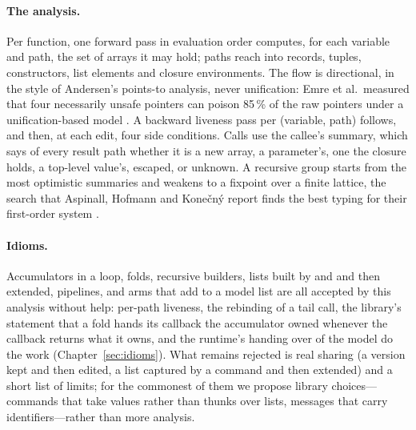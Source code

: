 \paragraph{The analysis.} Per function, one forward pass in evaluation order computes, for each
variable and path, the set of arrays it may hold; paths reach into records, tuples, constructors,
list elements and closure environments. The flow is directional, in the style of Andersen's
points-to analysis, never unification: Emre et al.\ measured that four necessarily unsafe pointers can
poison 85\,\% of the raw pointers under a unification-based model \citep[\S5]{emre2023aliasing}. A
backward liveness pass per (variable, path) follows, and then, at each edit, four side conditions.
Calls use the callee's summary, which says of every result path whether it is a new array, a
parameter's, one the closure holds, a top-level value's, escaped, or unknown. A recursive group starts
from the most optimistic summaries and weakens to a fixpoint over a finite lattice, the search that
Aspinall, Hofmann and Kone\v{c}n\'y report finds the best typing for their first-order system
\citep[\S6.2]{aspinall2008usage}.

\paragraph{Idioms.} Accumulators in a loop, folds, recursive builders, lists built by  and
 and then extended, pipelines, and  arms that add to a model list are all
accepted by this analysis without help: per-path liveness, the rebinding of a tail call, the
library's statement that a fold hands its callback the accumulator owned whenever the callback returns
what it owns, and the runtime's handing
over of the model do the work (Chapter~\ref{sec:idioms}). What remains rejected is real sharing
(a version kept and then edited, a list captured by a command and then extended) and a short list of
limits; for the commonest of them we propose library choices---commands that take values rather than
thunks over lists, messages that carry identifiers---rather than more analysis.

